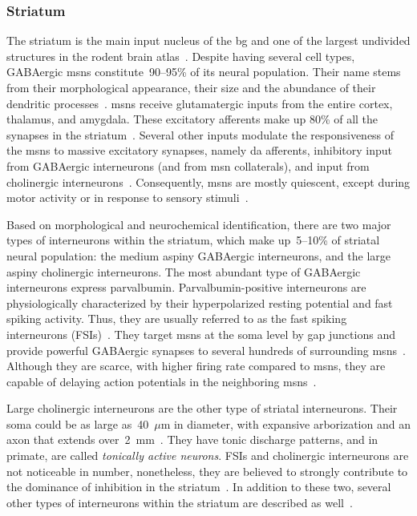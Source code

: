 


\subsubsection{Striatum} \label{intro:anatomy:striatum}
The striatum is the main input nucleus of the \gls{bg} and one of the largest undivided structures in the rodent brain atlas~\cite{Hintiryan2016NN,Hunnicutt2016}.
Despite having several cell types, GABAergic \glspl{msn} constitute~90--95\% of its neural population.
Their name stems from their morphological appearance, their size and the abundance of their dendritic processes~\cite{TURNER2000BasalFunction}.
\Glspl{msn} receive glutamatergic inputs from the entire cortex, thalamus, and amygdala.
These excitatory afferents make up 80\% of all the synapses in the striatum~\cite{Wilson2007GABAergicNeostriatum}.
Several other inputs modulate the responsiveness of the \glspl{msn} to massive excitatory synapses, namely \gls{da} afferents, inhibitory input from GABAergic interneurons (and from \gls{msn} collaterals), and input from cholinergic interneurons~\cite{Dudman2015Book}.
Consequently, \glspl{msn} are mostly quiescent, except during motor activity or in response to sensory stimuli~\cite{KandelBook2001}.
\par
Based on morphological and neurochemical identification, there are two major types of interneurons within the striatum, which make up~5--10\% of striatal neural population:
    the medium aspiny GABAergic interneurons, and the large aspiny cholinergic interneurons.
The most abundant type of GABAergic interneurons express parvalbumin.
Parvalbumin-positive interneurons are physiologically characterized by their hyperpolarized resting potential and fast spiking activity.
Thus, they are usually referred to as the fast spiking interneurons (FSIs)~\cite{Dudman2015Book}.
They target \glspl{msn} at the soma level by gap junctions and provide powerful GABAergic synapses to several hundreds of surrounding \glspl{msn}~\cite{Grillner2016BG, Gage2010FSI}.
Although they are scarce, with higher firing rate compared to \glspl{msn}, they are capable of delaying action potentials in the neighboring \glspl{msn}~\cite{Wilson2007GABAergicNeostriatum}.
\par
Large cholinergic interneurons are the other type of striatal interneurons.
Their soma could be as large as~40~$\mu$m in diameter, with expansive arborization and an axon that extends over~2~mm~\cite{Dudman2015Book}.
They have tonic discharge patterns, and in primate, are called \textit{tonically active neurons}.
FSIs and cholinergic interneurons are not noticeable in number, nonetheless, they are believed to strongly contribute to the dominance of inhibition in the striatum~\cite{Gage2010FSI}.
In addition to these two, several other types of interneurons within the striatum are described as well~\cite[see][]{Grillner2016BG, Dudman2015Book}.

